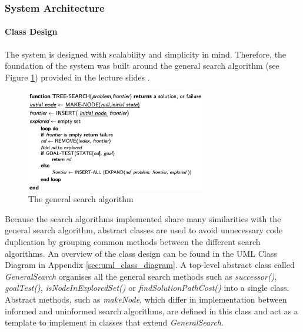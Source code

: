 \documentclass[letterpaper,12pt]{article}
\begin{document}

\subsubsection{System Architecture}

\paragraph{Class Design}

The system is designed with scalability and simplicity in mind. Therefore, the foundation of the system was built around the general search algorithm (see Figure \ref{fig:general_algorithm}) provided in the lecture slides \cite{generalsearchalg}.

\begin{figure}[ht]
\centering
\includegraphics[width=0.7\textwidth]{report/figures/general_search_algorithm.png}
\caption{\label{fig:general_algorithm}The general search algorithm \cite{generalsearchalg}}
\end{figure}

Because the search algorithms implemented share many similarities with the general search algorithm, abstract classes are used to avoid unnecessary code duplication by grouping common methods between the different search algorithms. An overview of the class design can be found in the UML Class Diagram in Appendix \ref{sec:uml_class_diagram}. A top-level abstract class called \textit{GeneralSearch} organises all the general search methods such as \textit{successor()}, \textit{goalTest()}, \textit{isNodeInExploredSet()} or \textit{findSolutionPathCost()} into a single class. Abstract methods, such as \textit{makeNode}, which differ in implementation between informed and uninformed search algorithms, are defined in this class and act as a template to implement in classes that extend \textit{GeneralSearch}.\\
\end{document}
